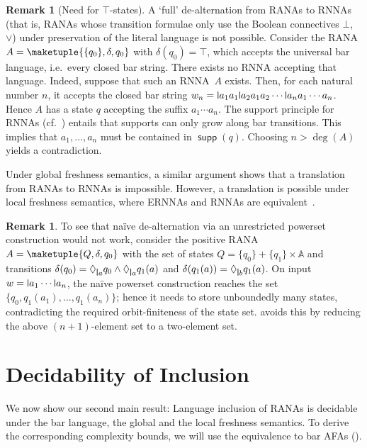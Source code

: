 \documentclass[10pt,a4paper]{amsart}
\theoremstyle{definition}
\newtheorem{rem}[theo]{Remark}
\newcommand{\At}{\mathds{A}}
\DeclareMathOperator{\supp}{\mathsf{supp}}
\newcommand{\names}{\At}
\newcommand{\set}[1]{\{#1\}}
\newcommand{\midmid}{\hspace{0.2ex}{\rule[-0.1ex]{0.6pt}{1.65ex}}\hspace{0.2ex}}
\newcommand{\newletter}[1]{{\midmid}#1}
\begin{document}
\begin{rem}[Need for $\top$-states]%
A `full' de-alternation from RANAs to RNNAs (that is, RANAs whose transition formulae only use the Boolean connectives $\bot$, $\vee$) under preservation of the literal language is not possible. Consider the RANA $A = \maketuple{\set{q_0},\delta,q_0}$ with
    $\delta(q_0) = \top$, which accepts the universal bar language, i.e.~every closed bar string.
    There exists no RNNA accepting that language. Indeed, suppose that such an RNNA~$A$ exists.
    Then, for each natural number $n$, it accepts the closed bar string
    $w_n = \newletter{a_1}a_1\newletter{a_2}a_1a_2\cdots\newletter{a_n}a_1\cdots a_n$.
    Hence $A$ has a state $q$ accepting the suffix $a_1 \cdots a_n$. The support principle for RNNAs
    (cf.~\cite[Lemma~5.4]{skmw17}) entails that supports can only grow along bar transitions. This
    implies that $a_1, \dots, a_n$ must be contained in $\supp(q)$. Choosing $n>\deg(A)$ yields a contradiction.

    Under global freshness semantics, a similar argument shows that a translation from RANAs
    to RNNAs is impossible. However, a translation is possible under local freshness semantics,
    where ERNNAs and RNNAs are equivalent~\cite[Rem.~5.2]{hms21}. 
\end{rem}

\begin{rem}\label{rem:powerset}%
To see that naïve de-alternation via an unrestricted powerset construction would not work,
consider the positive RANA $A = \maketuple{Q, \delta, q_0}$ with the set of states $Q = \set{q_0} +
  \set{q_1} \times \names$ and transitions $\delta(q_0) = \Diamond_{\newletter a} q_0 \wedge \Diamond_{\newletter a} q_1(a)$ and $\delta(q_1(a)) = \Diamond_{\newletter b} q_1(a)$.
  On input $w = \newletter{a_1}\cdots\newletter{a_n}$, the naïve powerset construction reaches the set $\{q_0,q_1(a_1),\ldots, q_1(a_n)\}$; hence it needs to store unboundedly many states, contradicting the required orbit-finiteness of
  the state set.
   avoids this by reducing the above $(n+1)$-element set to a two-element set.
\end{rem}


\section{Decidability of Inclusion} \label{sec:decincl}

We now show our second main result:
Language inclusion of RANAs is decidable under the bar language, the global and the local freshness semantics.
To derive the corresponding complexity bounds, we will use the equivalence to bar AFAs ().
\end{document}
